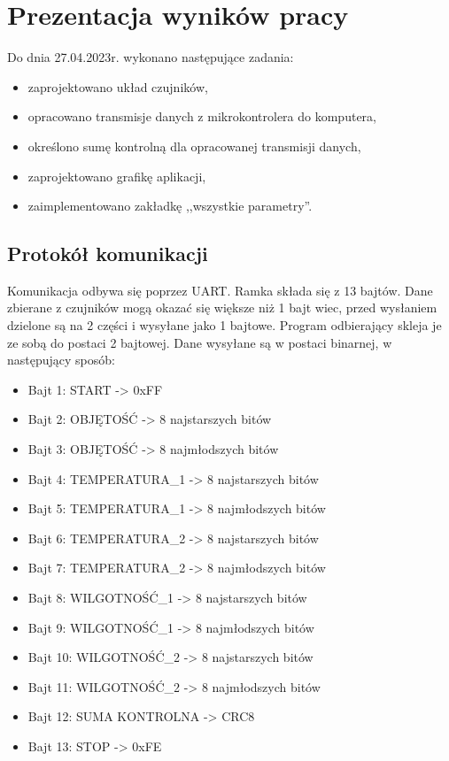 \section{Prezentacja wyników pracy}
    Do dnia 27.04.2023r. wykonano następujące zadania:
    \begin{itemize}
        \item zaprojektowano układ czujników,
        \item opracowano transmisje danych z mikrokontrolera do komputera,
        \item określono sumę kontrolną dla opracowanej transmisji danych,
        \item zaprojektowano grafikę aplikacji,
        \item zaimplementowano zakładkę ,,wszystkie parametry''. 
    \end{itemize}

    \subsection{Protokół komunikacji}
        Komunikacja odbywa się poprzez UART. Ramka składa się z 13 bajtów. Dane 
        zbierane z czujników mogą okazać się większe niż 1 bajt wiec,
        przed wysłaniem dzielone są na 2 części i wysyłane jako 1 bajtowe. Program odbierający
        skleja je ze sobą do postaci 2 bajtowej. Dane wysyłane są w postaci  binarnej,
        w następujący sposób:
        \begin{itemize}
            \item Bajt 1: START -> 0xFF
            \item Bajt 2: OBJĘTOŚĆ -> 8 najstarszych bitów
            \item Bajt 3: OBJĘTOŚĆ -> 8 najmłodszych bitów
            \item Bajt 4: TEMPERATURA\_1 -> 8 najstarszych bitów
            \item Bajt 5: TEMPERATURA\_1 -> 8 najmłodszych  bitów
            \item Bajt 6: TEMPERATURA\_2 -> 8 najstarszych bitów
            \item Bajt 7: TEMPERATURA\_2 -> 8 najmłodszych  bitów
            \item Bajt 8: WILGOTNOŚĆ\_1 ->  8 najstarszych bitów
            \item Bajt 9: WILGOTNOŚĆ\_1 ->  8 najmłodszych bitów
            \item Bajt 10: WILGOTNOŚĆ\_2 ->  8 najstarszych  bitów
            \item Bajt 11: WILGOTNOŚĆ\_2 ->  8 najmłodszych  bitów
            \item Bajt 12: SUMA KONTROLNA -> CRC8
            \item Bajt 13: STOP -> 0xFE
        \end{itemize}
